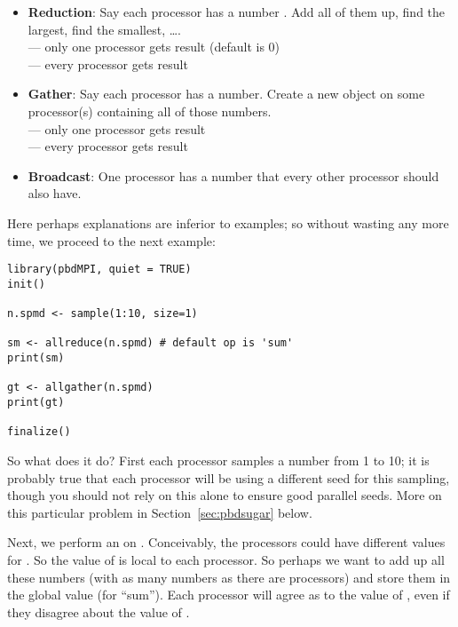 \begin{itemize}
  \item \textbf{Reduction}:  Say each processor has a number . Add all of them up, find the largest, find the smallest, \dots .\\
   --- only one processor gets result (default is 0)\\
   --- every processor gets result
  \item \textbf{Gather}: Say each processor has a number. Create a new object on some processor(s) containing all of those numbers.\\
   --- only one processor gets result\\
   --- every processor gets result
  \item \textbf{Broadcast}: One processor has a number  that every other processor should also have.\\
\end{itemize}

Here perhaps explanations are inferior to examples; so without wasting any more time, we proceed to the next example:

\begin{lstlisting}[language=rr,title=Simple pbdMPI Example 2]
library(pbdMPI, quiet = TRUE)
init()

n.spmd <- sample(1:10, size=1)

sm <- allreduce(n.spmd) # default op is 'sum'
print(sm)

gt <- allgather(n.spmd)
print(gt)

finalize()
\end{lstlisting}

So what does it do?  First each processor samples a number from 1 to 10; it is probably true that each processor will be using a different seed for this sampling, though you should not rely on this alone to ensure good parallel seeds.  More on this particular problem in Section~\ref{sec:pbdsugar} below.

Next, we perform an  on .  Conceivably, the processors could have different values for .  So the value of  is local to each processor.  So perhaps we want to add up all these numbers (with as many numbers as there are processors) and store them in the global value  (for ``sum'').  Each processor will agree as to the value of , even if they disagree about the value of .

